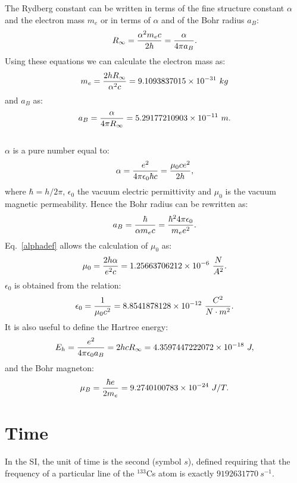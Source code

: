 \documentclass[12pt,a4paper]{article}
\def\me{9.1093837015\times 10^{-31}}
\def\abohr{5.29177210903\times 10^{-11}}
\def\muzero{1.25663706212\times 10^{-6}}
\def\epsilonzero{8.8541878128\times 10^{-12}}
\def\bohrmag{9.2740100783\times 10^{-24}}
\def\baru{4.3597447222072\times 10^{-18}}
\begin{document}
The Rydberg constant can be written in terms of the fine structure
constant $\alpha$ and the electron mass $m_e$ or in terms of $\alpha$ and
of the Bohr radius $a_B$:
\begin{equation}
R_\infty={\alpha^2 m_e c \over 2 h}={\alpha \over 4 \pi a_B}.
\end{equation}
Using these equations we can calculate the electron mass as:
\begin{equation}
m_e={2 h R_\infty\over \alpha^2 c}=
\me\ kg
\end{equation} 
and $a_B$ as:
\begin{equation}
a_B={\alpha\over 4\pi R_\infty}=
\abohr\ m.
\end{equation}
\\
$\alpha$ is a pure number equal to:
\begin{equation}
\alpha={e^2 \over 4 \pi \epsilon_0 \hbar c}= {\mu_0 c e^2 \over 2 h}, 
\label{alphadef}
\end{equation}
where $\hbar=h/2\pi$, $\epsilon_0$ the vacuum electric
permittivity and $\mu_0$ is the vacuum magnetic permeability. Hence
the Bohr radius can be rewritten as:
\begin{equation}
a_B={\hbar \over \alpha m_e c}=
{\hbar^2 4 \pi \epsilon_0 \over m_e e^2}.
\end{equation}
Eq.~\ref{alphadef} allows the calculation of $\mu_0$ as:
\begin{equation}
\mu_0={2 h \alpha \over e^2 c}=\muzero\ {N\over A^2}.
\label{mu0}
\end{equation}
$\epsilon_0$ is obtained from the relation:
\begin{equation}
\epsilon_0={1 \over \mu_0 c^2}=\epsilonzero\ 
{C^2\over N\cdot m^2}.
\label{epsilon0}
\end{equation}
It is also useful to define the Hartree energy:
\begin{equation}
E_h= {e^2\over 4\pi\epsilon_0 a_B}=2 h c R_\infty = \baru\ J,
\label{eh}
\end{equation}
and the Bohr magneton:
\begin{equation}
\mu_B = {\hbar e \over 2 m_e} = \bohrmag\ J/T.
\label{bohrm}
\end{equation}

\newpage
\section{\color{coral}Time}
In the SI, the unit of time is the second 
(symbol $s$), defined requiring that the frequency of a particular 
line of the $^{133}$Cs atom is exactly $9192631770\ s^{-1}$.
\\
\end{document}
